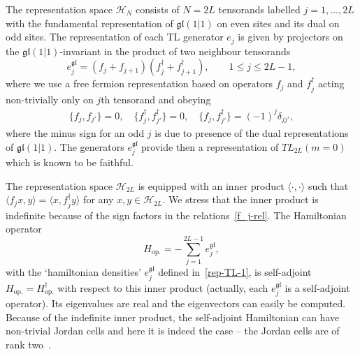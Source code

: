 \documentclass[11pt]{article}
\newcommand{\TL}[1]{TL_{#1}}
\newcommand{\inn}[2]{\langle#1,#2\rangle}
\newcommand{\Hilb}{\mathcal{H}}
\newcommand{\gl}{\mathfrak{gl}}
\newcommand{\chVv}{\Hilb_{N}}
\theoremstyle{definition}
\begin{document}
 The representation space $\chVv$ consists of
 $N=2L$ tensorands
labelled $j=1,\ldots,2L$ with the fundamental representation of $\gl(1|1)$ on even sites and its dual on odd sites.
The representation of each TL generator $e_j$ is given by projectors on the $\gl(1|1)$-invariant in the
product of two neighbour tensorands
%
\begin{equation}\label{rep-TL-1}
e_j^{\gl}= (f_j+f_{j+1})(f_j^\dagger+f_{j+1}^\dagger),\qquad 1\leq
j\leq 2L-1,
\end{equation}
%
where we use a free fermion representation based on operators $f_j$
and $f_j^\dagger$ acting non-trivially only on $j$th tensorand and obeying
%
\begin{eqnarray}\label{f_j-rel}
\{f_j,f_{j'}\}=0,\quad\{f^{\dagger}_j,f^{\dagger}_{j'}\}=0,\quad\{f_j,f_{j'}^\dagger\}=(-1)^{j}\delta_{jj'},
\end{eqnarray}
%
where the minus sign  for an odd $j$ is due to presence of the dual representations of $\gl(1|1)$.
The generators $e_j^{\gl}$  provide then a
representation of $\TL{2L}(m=0)$ which
is known to be faithful.

 The representation space $\Hilb_{2L}$ is equipped with an inner
 product $\inn{\cdot}{\cdot}$ such that $\inn{f_j
 x}{y}=\inn{x}{f_j^{\dagger}y}$ for any $x,y\in\Hilb_{2L}$.  We stress
 that the inner product is indefinite because of the sign factors in
 the relations~\eqref{f_j-rel}. The Hamiltonian operator
 \begin{equation*}
 H_{\mathrm{op.}}=-\sum_{j=1}^{2L-1}e^{\gl}_j,
 \end{equation*}
with the `hamiltonian densities' $e^{\gl}_j$ defined in~\eqref{rep-TL-1}, is self-adjoint $H_{\mathrm{op.}}=H_{\mathrm{op.}}^{\dagger}$ with respect to this inner product (actually, each $e_j^{\gl}$ is a self-adjoint operator).
Its eigenvalues are real and the eigenvectors can easily be  computed. Because of the indefinite inner product, the self-adjoint Hamiltonian can have non-trivial Jordan cells and here it is indeed the case -- the Jordan cells are of rank two~\cite{ReadSaleur07-2}.
\end{document}
